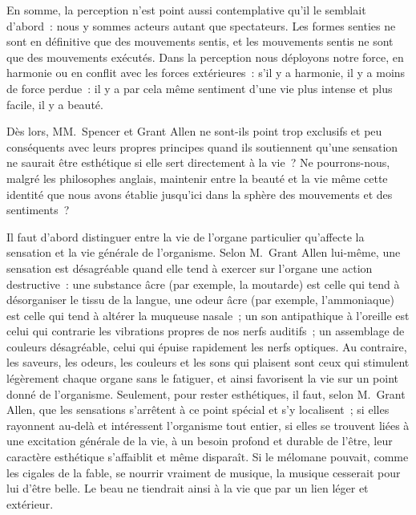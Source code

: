 \documentclass[french,twoside]{book} %
\begin{document}
En somme, la perception n’est point aussi contemplative qu’il le semblait d’abord : nous y sommes acteurs autant que spectateurs. Les formes senties ne sont en définitive que des mouvements sentis, et les mouvements sentis ne sont que des mouvements exécutés. Dans la perception nous déployons notre force, en harmonie ou en conflit avec les forces extérieures : s’il y a harmonie, il y a moins de  force perdue : il y a par cela même sentiment d’une vie plus intense et plus facile, il y a beauté.\par
Dès lors, MM. Spencer et Grant Allen ne sont-ils point trop exclusifs et peu conséquents avec leurs propres principes quand ils soutiennent qu’une sensation ne saurait être esthétique si elle sert directement à la vie ? Ne pourrons-nous, malgré les philosophes anglais, maintenir entre la beauté et la vie même cette identité que nous avons établie jusqu’ici dans la sphère des mouvements et des sentiments ?\par
Il faut d’abord distinguer entre la vie de l’organe particulier qu’affecte la sensation et la vie générale de l’organisme. Selon M. Grant Allen lui-même, une sensation est désagréable quand elle tend à exercer sur l’organe une action destructive : une substance âcre (par exemple, la moutarde) est celle qui tend à désorganiser le tissu de la langue, une odeur âcre (par exemple, l’ammoniaque) est celle qui tend à altérer la muqueuse nasale ; un son antipathique à l’oreille est celui qui contrarie les vibrations propres de nos nerfs auditifs ; un assemblage de couleurs désagréable, celui qui épuise rapidement les nerfs optiques. Au contraire, les saveurs, les odeurs, les couleurs et les sons qui plaisent sont ceux qui stimulent légèrement chaque organe sans le fatiguer, et ainsi favorisent la vie sur un point donné de l’organisme. Seulement, pour rester esthétiques, il faut, selon M. Grant Allen, que les sensations s’arrêtent à ce point spécial et s’y localisent ; si elles rayonnent au-delà et intéressent l’organisme tout entier, si elles se trouvent liées à une excitation générale de la  vie, à un besoin profond et durable de l’être, leur caractère esthétique s’affaiblit et même disparaît. Si le mélomane pouvait, comme les cigales de la fable, se nourrir vraiment de musique, la musique cesserait pour lui d’être belle. Le beau ne tiendrait ainsi à la vie que par un lien léger et extérieur.\par
\end{document}
